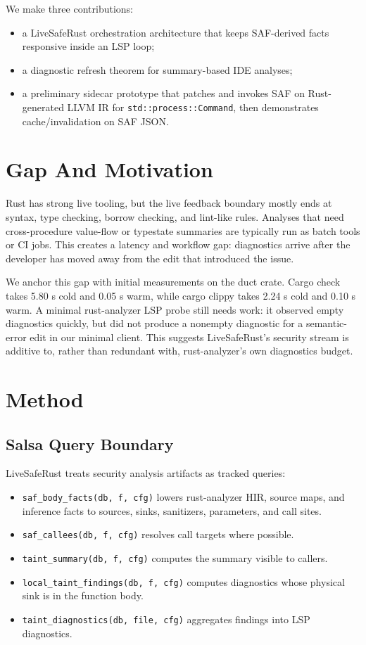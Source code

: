 \documentclass[sigconf,nonacm]{acmart}
\begin{document}
We make three contributions:
\begin{itemize}
  \item a LiveSafeRust orchestration architecture that keeps SAF-derived facts
  responsive inside an LSP loop;
  \item a diagnostic refresh theorem for summary-based IDE analyses;
  \item a preliminary sidecar prototype that patches and invokes SAF on
  Rust-generated LLVM IR for \texttt{std::process::Command}, then demonstrates
  cache/invalidation on SAF JSON.
\end{itemize}

\section{Gap And Motivation}

Rust has strong live tooling, but the live feedback boundary mostly ends at
syntax, type checking, borrow checking, and lint-like rules. Analyses that need
cross-procedure value-flow or typestate summaries are typically run as batch
tools or CI jobs. This creates a latency and workflow gap: diagnostics arrive
after the developer has moved away from the edit that introduced the issue.

We anchor this gap with initial measurements on the duct crate. Cargo check
takes 5.80 s cold and 0.05 s warm, while cargo clippy takes 2.24 s cold and
0.10 s warm. A minimal rust-analyzer LSP probe still needs work: it observed
empty diagnostics quickly, but did not produce a nonempty diagnostic for a
semantic-error edit in our minimal client.
This suggests LiveSafeRust's security stream is additive to, rather than
redundant with, rust-analyzer's own diagnostics budget.

\section{Method}

\subsection{Salsa Query Boundary}

LiveSafeRust treats security analysis artifacts as tracked queries:
\begin{itemize}
  \item \texttt{saf\_body\_facts(db, f, cfg)} lowers rust-analyzer HIR, source
  maps, and inference facts to sources, sinks, sanitizers, parameters, and call
  sites.
  \item \texttt{saf\_callees(db, f, cfg)} resolves call targets where possible.
  \item \texttt{taint\_summary(db, f, cfg)} computes the summary visible to
  callers.
  \item \texttt{local\_taint\_findings(db, f, cfg)} computes diagnostics whose
  physical sink is in the function body.
  \item \texttt{taint\_diagnostics(db, file, cfg)} aggregates findings into LSP
  diagnostics.
\end{itemize}
\end{document}
